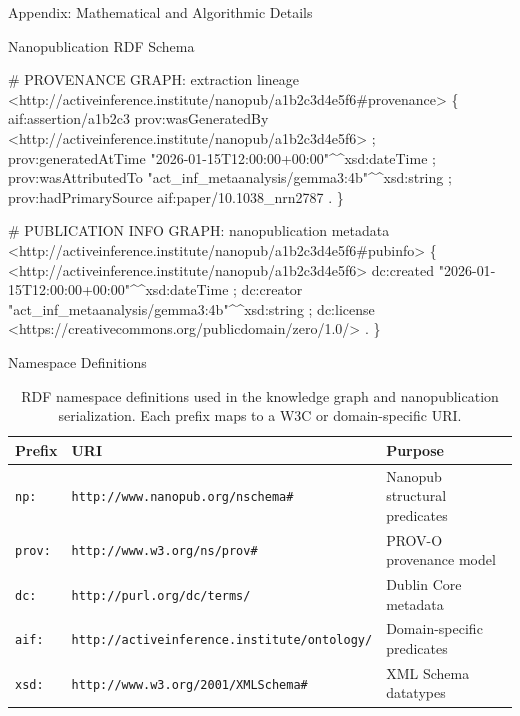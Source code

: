 \documentclass[
  ignorenonframetext,
]{beamer}
\newenvironment{Shaded}{}{}
\newcommand{\NormalTok}[1]{#1}
\begin{document}
\begin{frame}[fragile]{Appendix: Mathematical and Algorithmic Details
\label{sec:technical_appendix}}
\begin{block}{Nanopublication RDF Schema \label{sec:appendix_rdf}}
\begin{Shaded}
\begin{Highlighting}[]
\NormalTok{\# PROVENANCE GRAPH: extraction lineage}
\NormalTok{\textless{}http://activeinference.institute/nanopub/a1b2c3d4e5f6\#provenance\textgreater{} \{}
\NormalTok{  aif:assertion/a1b2c3}
\NormalTok{    prov:wasGeneratedBy  \textless{}http://activeinference.institute/nanopub/a1b2c3d4e5f6\textgreater{} ;}
\NormalTok{    prov:generatedAtTime "2026{-}01{-}15T12:00:00+00:00"\^{}\^{}xsd:dateTime ;}
\NormalTok{    prov:wasAttributedTo "act\_inf\_metaanalysis/gemma3:4b"\^{}\^{}xsd:string ;}
\NormalTok{    prov:hadPrimarySource aif:paper/10.1038\_nrn2787 .}
\NormalTok{\}}

\NormalTok{\# PUBLICATION INFO GRAPH: nanopublication metadata}
\NormalTok{\textless{}http://activeinference.institute/nanopub/a1b2c3d4e5f6\#pubinfo\textgreater{} \{}
\NormalTok{  \textless{}http://activeinference.institute/nanopub/a1b2c3d4e5f6\textgreater{}}
\NormalTok{    dc:created "2026{-}01{-}15T12:00:00+00:00"\^{}\^{}xsd:dateTime ;}
\NormalTok{    dc:creator "act\_inf\_metaanalysis/gemma3:4b"\^{}\^{}xsd:string ;}
\NormalTok{    dc:license \textless{}https://creativecommons.org/publicdomain/zero/1.0/\textgreater{} .}
\NormalTok{\}}
\end{Highlighting}
\end{Shaded}

\begin{block}{Namespace Definitions}
\protect{}\label{namespace-definitions}
\begin{table}[htbp]
\centering
\caption{RDF namespace definitions used in the knowledge graph and nanopublication serialization. Each prefix maps to a W3C or domain-specific URI.}
\label{tab:namespace_definitions}
\begin{tabular}{lll}
\toprule
\textbf{Prefix} & \textbf{URI} & \textbf{Purpose} \\
\midrule
\texttt{np:} & \texttt{http://www.nanopub.org/nschema\#} & Nanopub structural predicates \\
\texttt{prov:} & \texttt{http://www.w3.org/ns/prov\#} & PROV-O provenance model \\
\texttt{dc:} & \texttt{http://purl.org/dc/terms/} & Dublin Core metadata \\
\texttt{aif:} & \texttt{http://activeinference.institute/ontology/} & Domain-specific predicates \\
\texttt{xsd:} & \texttt{http://www.w3.org/2001/XMLSchema\#} & XML Schema datatypes \\
\bottomrule
\end{tabular}
\end{table}
\end{block}


\end{block}
\end{frame}
\end{document}
